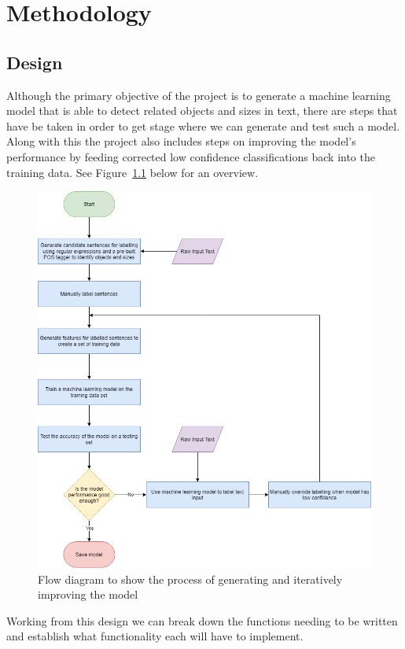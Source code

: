 \documentclass[11pt,oneside]{book}
\begin{document}
\chapter{Methodology}
\section{Design}
Although the primary objective of the project is to generate a machine learning model that is able to detect related objects and sizes in text, there are steps that have be taken in order to get stage where we can generate and test such a model. Along with this the project also includes steps on improving the model's performance by feeding corrected low confidence classifications back into the training data. See Figure~\ref{fig:model_flow} below for an overview. \newpage

\begin{figure}[!htbp]
\centering
\includegraphics[scale=0.6]{figures/ModelFlowDiagram.png}
\caption{Flow diagram to show the process of generating and iteratively improving the model}
\label{fig:model_flow}
\end{figure}
\newpage

Working from this design we can break down the functions needing to be written and establish what functionality each will have to implement. 
\end{document}
